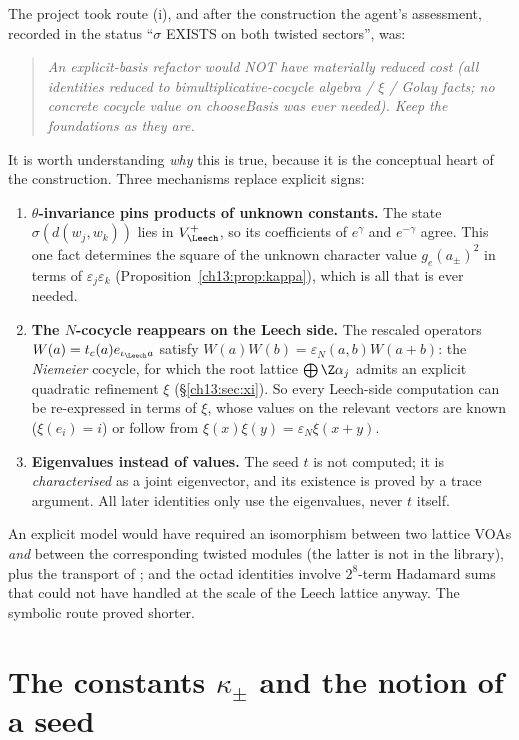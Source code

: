 The project took route (i), and after the construction the agent's assessment, recorded in the
status ``$\sigma$ EXISTS on both twisted sectors'', was:
\begin{quote}
\emph{An explicit-basis refactor would NOT have materially reduced cost (all identities reduced to
bimultiplicative-cocycle algebra / $\xi$ / Golay facts; no concrete cocycle value on chooseBasis was
ever needed). Keep the foundations as they are.}
\end{quote}
It is worth understanding \emph{why} this is true, because it is the conceptual heart of the
construction. Three mechanisms replace explicit signs:
\begin{enumerate}
\item \textbf{$\theta$-invariance pins products of unknown constants.} The state $\sigma(d(w_j,w_k))$ lies in
  $V_\Leech^+$, so its coefficients of $e^{\gamma}$ and $e^{-\gamma}$ agree. This one fact determines the
  square of the unknown character value $g_e(a_\pm)^2$ in terms of $\varepsilon_j\varepsilon_k$
  (Proposition~\ref{ch13:prop:kappa}), which is all that is ever needed.
\item \textbf{The $N$-cocycle reappears on the Leech side.} The rescaled operators
  $W(a)=t_c(a)e_{\iota_\Leech a}$ satisfy $W(a)W(b)=\varepsilon_N(a,b)W(a+b)$: the \emph{Niemeier} cocycle, for
  which the root lattice $\bigoplus\Z\alpha_j$ admits an explicit quadratic refinement $\xi$ (\S\ref{ch13:sec:xi}).
  So every Leech-side computation can be re-expressed in terms of $\xi$, whose values on the
  relevant vectors are known ($\xi(e_i)=i$) or follow from $\xi(x)\xi(y)=\varepsilon_N\xi(x+y)$.
\item \textbf{Eigenvalues instead of values.} The seed $t$ is not computed; it is \emph{characterised}
  as a joint eigenvector, and its existence is proved by a trace argument. All later identities only
  use the eigenvalues, never $t$ itself.
\end{enumerate}
An explicit model would have required an isomorphism between two lattice VOAs \emph{and} between the
corresponding twisted modules (the latter is not in the library), plus the transport of
; and the octad identities involve $2^{8}$-term Hadamard sums that 
could not have handled at the scale of the Leech lattice anyway. The symbolic route proved shorter.

\section{\texorpdfstring{The constants $\kappa_\pm$ and the notion of a seed}{The constants kappapm and the notion of a seed}}\label{ch13:sec:kappa}


